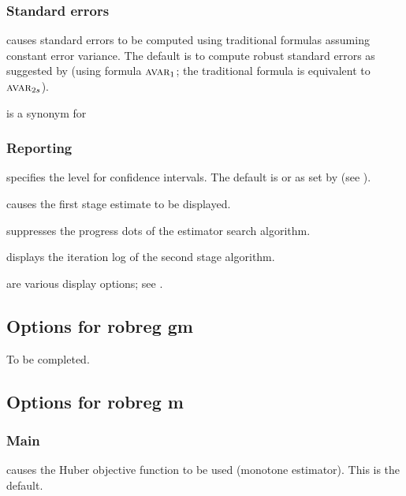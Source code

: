 \subsubsection{Standard errors}

\hangpara
     causes standard errors to be computed
    using traditional formulas assuming constant error variance. The default
    is to compute robust standard errors as suggested by \citet{Croux:2003}
    (using formula $\stsc{Avar}_1$; the traditional formula is equivalent to
    $\stsc{Avar}_{2s}$).

\hangpara
     is a synonym for 

\subsubsection{Reporting}

\hangpara
     specifies the level for confidence intervals. The
    default is  or as set by  (see
    ).

\hangpara
     causes the first stage  estimate to be displayed.

\hangpara
     suppresses the progress dots of the  estimator
    search algorithm.

\hangpara
     displays the iteration log of the second stage 
    algorithm.
    
\hangpara
     are various display options; see .

\subsection{Options for robreg gm}

\alert{To be completed.}

\subsection{Options for robreg m}

\subsubsection{Main}

\hangpara
     causes the Huber objective function to be used
    (monotone  estimator). This is the default.

